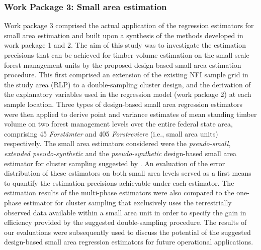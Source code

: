 
\subsubsection{Work Package 3: Small area estimation} %


Work package 3 comprised the actual application of the regression estimators for small area estimation and built upon a synthesis of the methods developed in work package 1 and 2. The aim of this study was to investigate the estimation precisions that can be achieved for timber volume estimation on the small scale forest management units by the proposed design-based small area estimation procedure. This first comprised an extension of the existing NFI sample grid in the study area (RLP) to a double-sampling cluster design, and the derivation of the explanatory variables used in the regression model (work package 2) at each sample location. Three types of design-based small area regression estimators were then applied to derive point and variance estimates of mean standing timber volume on two forest management levels over the entire federal state area, comprising 45 \textit{Forst{\"a}mter} and 405 \textit{Forstreviere} (i.e., small area units) respectively. The small area estimators considered were the \textit{pseudo-small}, \textit{extended pseudo-synthetic} and the \textit{pseudo-synthetic} design-based small area estimator for cluster sampling suggested by \citet{mandallaz2013a, mandallaz2013b}. An evaluation of the error distribution of these estimators on both small area levels served as a first means to quantify the estimation precisions achievable under each estimator. The estimation results of the multi-phase estimators were also compared to the one-phase estimator for cluster sampling that exclusively uses the terrestrially observed data available within a small area unit in order to specify the gain in efficiency provided by the suggested double-sampling procedure. The results of our evaluations were subsequently used to discuss the potential of the suggested design-based small area regression estimators for future operational applications.

